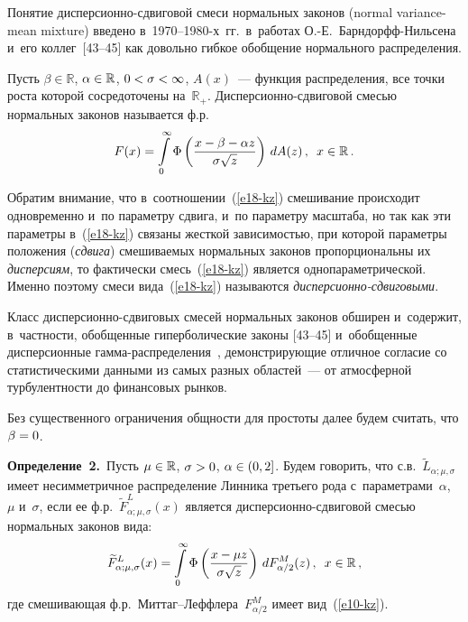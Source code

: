 \begin{multicols}{2}
\columnbreak

Понятие дисперсионно-сдвиговой смеси нормальных законов (normal
variance-mean mixture) введено в~1970--1980-х~гг.\
 в~работах О.-Е.~Барн\-дорфф-Ниль\-се\-на и~его 
коллег~[43--45] как довольно гибкое обобщение
нормального распреде\-ления.
{

}

Пусть $\beta\in\mathbb{R}$, $\alpha\hm\in\mathbb{R}$,
$0\hm<\sigma\hm<\infty$, $A(x)$~--- функция распределения, все точки роста
которой сосредоточены на~$\mathbb{R}_+$. Дис\-пер\-си\-он\-но-сдви\-го\-вой
смесью нормальных законов называется ф.р.
\begin{equation}
F(x)=\int\limits_{0}^{\infty}\Phi\left(\displaystyle\frac{\displaystyle x-\beta-\alpha
z\mathstrut}{\displaystyle \sigma\sqrt{z}\mathstrut}\right)\,dA(z)\,,\enskip x\in\mathbb{R}\,.
\label{e18-kz}
\end{equation}

Обратим внимание, что в~соотношении~(\ref{e18-kz}) смешивание происходит
одновременно и~по па\-ра\-мет\-ру сдвига, и~по параметру масштаба, но так
как эти параметры в~(\ref{e18-kz}) связаны жесткой за\-ви\-си\-мостью, при которой
параметры положения (\textit{сдвига}) смешиваемых нормальных законов
пропорциональны их \textit{дисперсиям}, то фактически смесь~(\ref{e18-kz})
является однопараметрической. Именно поэтому смеси вида~(\ref{e18-kz})
называются \textit{дис\-пер\-си\-он\-но-сдви\-го\-выми}. 
{

}

Класс
дис\-пер\-си\-он\-но-сдви\-го\-вых смесей нор\-маль\-ных законов обширен и~содержит,
в~част\-ности, обобщенные гиперболические законы \mbox{[43--45]}
и~обобщенные дисперсионные гам\-ма-рас\-пре\-де\-ле\-ния~\cite{KorolevSokolov2012, KorolevZaks2013}, 
демонстрирующие отличное
согласие со статистическими данными из самых разных областей~--- от
атмосферной турбулентности до финансовых рынков.

Без существенного ограничения общности для простоты далее будем
считать, что $\beta\hm=0$.

\bigskip

\noindent
\textbf{Определение~2.}\ Пусть $\mu\hm\in\mathbb{R}$, $\sigma\hm>0$,
$\alpha\hm\in(0,2]$. Будем говорить, что с.в.~$\widetilde L_{\alpha;\mu,\sigma}$ 
имеет несимметричное распределение Линника
третьего рода с~параметрами~$\alpha$, $\mu$ и~$\sigma$, если ее 
ф.р.~$\widetilde F^{L}_{\alpha;\mu,\sigma}(x)$ является
дис\-пер\-си\-он\-но-сдви\-го\-вой смесью нормальных законов вида:
$$
\widetilde F^{L}_{\alpha;\mu,\sigma}(x)=
\int\limits_{0}^{\infty}\Phi\left(\displaystyle\frac{\displaystyle x-\mu z\mathstrut}{\displaystyle \sigma\sqrt{z}\mathstrut}\right)\,dF^{M}_{\alpha/2}(z)\,,\enskip x\in\mathbb{R}\,,
$$
где смешивающая ф.р.\ Мит\-таг--Леф\-фле\-ра~$F^{M}_{\alpha/2}$ имеет вид~(\ref{e10-kz}).


\end{multicols}
